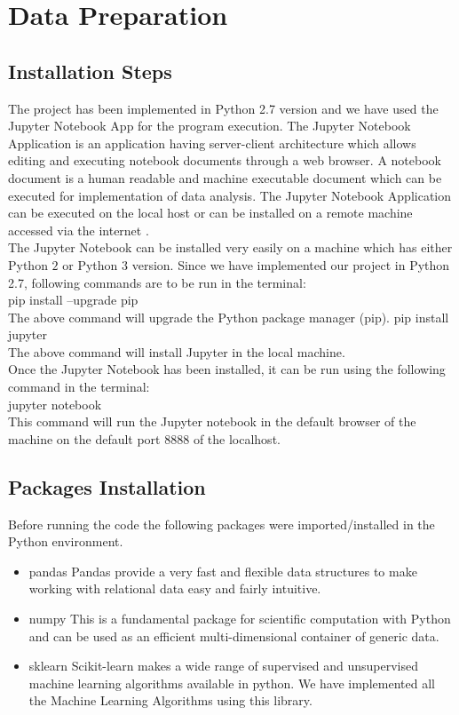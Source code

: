 \section*{Data Preparation}

\subsection{Installation Steps}
The project has been implemented in Python 2.7 version and we have used the Jupyter Notebook App for the program execution. The Jupyter Notebook Application is an application having server-client architecture which allows editing and executing notebook documents through a web browser. A notebook document is a human readable and machine executable document which can be executed for implementation of data analysis. The Jupyter Notebook Application can be executed on the local host or can be installed on a remote machine accessed via the internet \cite{link15}. \\
The Jupyter Notebook can be installed very easily on a machine which has either Python $2$ or Python $3$ version. Since we have implemented our project in Python 2.7, following commands are to be run in the terminal:\\
pip install --upgrade pip \\
The above command will upgrade the Python package manager (pip).
pip install jupyter \\
The above command will install Jupyter in the local machine.\\
Once the Jupyter Notebook has been installed, it can be run using the following command in the terminal:\\
jupyter notebook\\
This command will run the Jupyter notebook in the default browser of the machine on the default port $8888$ of the localhost.

\subsection{Packages Installation}
Before running the code the following packages were imported/installed in the Python environment.

\begin{itemize}
    \item pandas
    Pandas provide a very fast and flexible data structures to make working with relational data easy and fairly intuitive.
    \item numpy
    This is a fundamental package for scientific computation with Python and can be used as an efficient multi-dimensional container of generic data.
    \item sklearn
    Scikit-learn makes a wide range of supervised and unsupervised machine learning algorithms  available in python. We have implemented all the Machine Learning Algorithms using this library.
\end{itemize}


